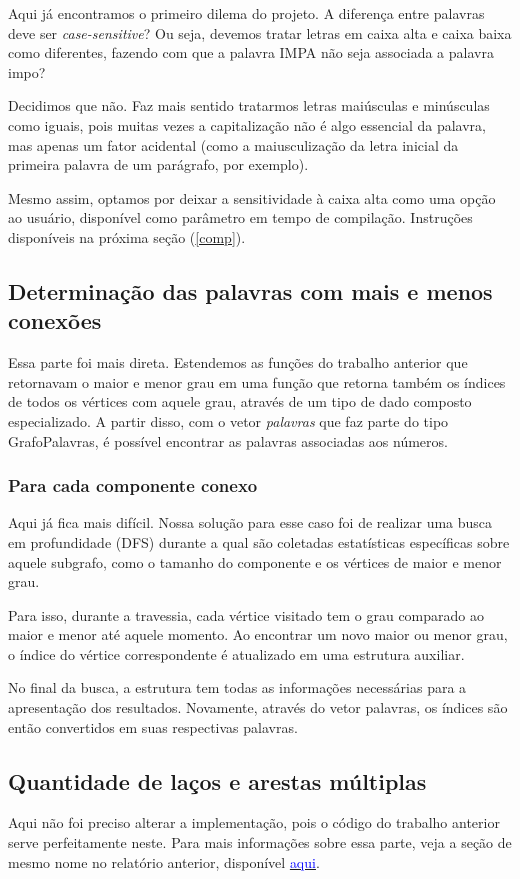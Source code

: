 \documentclass[a4paper, 12pt]{article}
\begin{document}
Aqui já encontramos o primeiro dilema do projeto. A diferença entre palavras
deve ser \textit{case-sensitive}? Ou seja, devemos tratar letras em caixa alta
e caixa baixa como diferentes, fazendo com que a palavra IMPA não seja associada
a palavra impo?

Decidimos que não. Faz mais sentido tratarmos letras maiúsculas e minúsculas como iguais,
pois muitas vezes a capitalização não é algo essencial da palavra, mas apenas um fator
acidental (como a maiusculização da letra inicial da primeira palavra de um parágrafo,
por exemplo).

Mesmo assim, optamos por deixar a sensitividade à caixa alta como uma opção ao usuário,
disponível como parâmetro em tempo de compilação. Instruções disponíveis na próxima
seção (\ref{comp}).

\subsection{Determinação das palavras com mais e menos conexões}
Essa parte foi mais direta. Estendemos as funções do trabalho anterior que retornavam
o maior e menor grau em uma função que retorna também os índices de todos os vértices
com aquele grau, através de um
tipo de dado composto especializado. A partir disso, com o vetor \textit{palavras}
que faz parte do tipo GrafoPalavras, é possível encontrar as palavras associadas aos números.

\subsubsection{Para cada componente conexo}
Aqui já fica mais difícil. Nossa solução para esse caso foi de realizar uma busca
em profundidade (DFS) durante a qual são coletadas estatísticas específicas sobre
aquele subgrafo, como o tamanho do componente e os vértices de maior e menor grau.

Para isso, durante a travessia, cada vértice visitado tem o grau comparado ao maior
e menor até aquele momento. Ao encontrar um novo maior ou menor grau, o índice do
vértice correspondente é atualizado em uma estrutura auxiliar.

No final da busca, a estrutura tem todas as informações necessárias para a apresentação
dos resultados. Novamente, através do vetor palavras, os índices são então convertidos
em suas respectivas palavras.

\subsection{Quantidade de laços e arestas múltiplas}
Aqui não foi preciso alterar a implementação, pois o código do trabalho anterior serve
perfeitamente neste. Para mais informações sobre essa parte, veja a seção de mesmo nome
no relatório anterior, disponível \href{https://github.com/atomicpenguinz/TEG_1/blob/main/relatorio/relatorio.pdf}{\textcolor{blue}{aqui}}.
\end{document}
